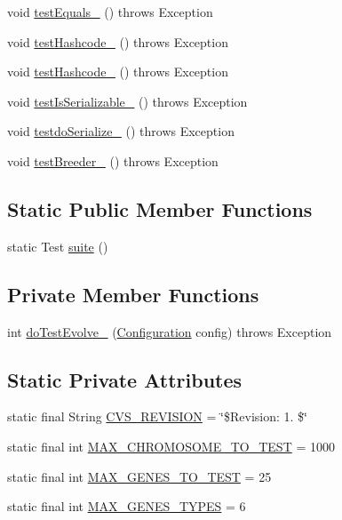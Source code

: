 \begin{DoxyCompactItemize}
void \hyperlink{classorg_1_1jgap_1_1_genotype_test_ab0a432986721b3c0e039ccb730746340}{test\-Equals\-\_} ()  throws Exception 
\item 
void \hyperlink{classorg_1_1jgap_1_1_genotype_test_a098e053b2fd6afa8e3ebbfe59a12e7f5}{test\-Hashcode\-\_} ()  throws Exception 
\item 
void \hyperlink{classorg_1_1jgap_1_1_genotype_test_acb6c4717fac19423cad2758364876996}{test\-Hashcode\-\_} ()  throws Exception 
\item 
void \hyperlink{classorg_1_1jgap_1_1_genotype_test_aa0d1c56bf7ef0e020f3d979f784dc5d3}{test\-Is\-Serializable\-\_} ()  throws Exception 
\item 
void \hyperlink{classorg_1_1jgap_1_1_genotype_test_a645930eb3586b858cf9177fe6c869c51}{testdo\-Serialize\-\_} ()  throws Exception 
\item 
void \hyperlink{classorg_1_1jgap_1_1_genotype_test_a51842aa1392bc7d20efa88197aab3f32}{test\-Breeder\-\_} ()  throws Exception 
\end{DoxyCompactItemize}
\subsection*{Static Public Member Functions}
\begin{DoxyCompactItemize}
\item 
static Test \hyperlink{classorg_1_1jgap_1_1_genotype_test_a4512df19f87eec00dd3dc4a373cfee99}{suite} ()
\end{DoxyCompactItemize}
\subsection*{Private Member Functions}
\begin{DoxyCompactItemize}
\item 
int \hyperlink{classorg_1_1jgap_1_1_genotype_test_a8066d3a563d87f0053623bf648a42443}{do\-Test\-Evolve\-\_} (\hyperlink{classorg_1_1jgap_1_1_configuration}{Configuration} config)  throws Exception 
\end{DoxyCompactItemize}
\subsection*{Static Private Attributes}
\begin{DoxyCompactItemize}
\item 
static final String \hyperlink{classorg_1_1jgap_1_1_genotype_test_a86c929024ec35824095bbe1491801fb6}{C\-V\-S\-\_\-\-R\-E\-V\-I\-S\-I\-O\-N} = \char`\"{}\$Revision\-: 1. \$\char`\"{}
\item 
static final int \hyperlink{classorg_1_1jgap_1_1_genotype_test_a1f3e7c6a2b19f5281bd339427fd07a7c}{M\-A\-X\-\_\-\-C\-H\-R\-O\-M\-O\-S\-O\-M\-E\-\_\-\-T\-O\-\_\-\-T\-E\-S\-T} = 1000
\item 
static final int \hyperlink{classorg_1_1jgap_1_1_genotype_test_a02545f85bc036a2b6371683494e169d2}{M\-A\-X\-\_\-\-G\-E\-N\-E\-S\-\_\-\-T\-O\-\_\-\-T\-E\-S\-T} = 25
\item 
static final int \hyperlink{classorg_1_1jgap_1_1_genotype_test_a9c8188a54218fb27dbfb06a3b9ade842}{M\-A\-X\-\_\-\-G\-E\-N\-E\-S\-\_\-\-T\-Y\-P\-E\-S} = 6
\end{DoxyCompactItemize}
